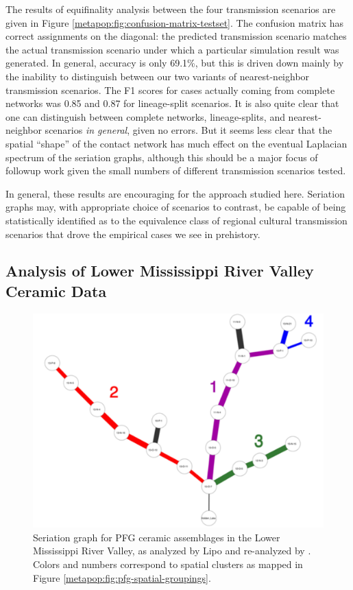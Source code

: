     The results of equifinality analysis between the four transmission scenarios are given in Figure \ref{metapop:fig:confusion-matrix-testset}.  The confusion matrix has correct assignments on the diagonal:  the predicted transmission scenario matches the actual transmission scenario under which a particular simulation result was generated.  In general, accuracy is only 69.1\%, but this is driven down mainly by the inability to distinguish between our two variants of nearest-neighbor transmission scenarios.  The F1 scores for cases actually coming from complete networks was 0.85 and 0.87 for lineage-split scenarios.  It is also quite clear that one can distinguish between complete networks, lineage-splits, and nearest-neighbor scenarios \emph{in general}, given no errors. But it seems less clear that the spatial ``shape'' of the contact network has much effect on the eventual Laplacian spectrum of the seriation graphs, although this should be a major focus of followup work given the small numbers of different transmission scenarios tested.  
    
    In general, these results are encouraging for the approach studied here.  Seriation graphs may, with appropriate choice of scenarios to contrast, be capable of being statistically identified as to the equivalence class of regional cultural transmission scenarios that drove the empirical cases we see in prehistory. 
    
    \subsection{Analysis of Lower Mississippi River Valley Ceramic Data}\label{metapop:sec:results-lmv}
    
    \begin{figure}[ht]
    \centering
    \includegraphics[scale=0.5]{graphics/multipleseriation/pfg-seriation-graph-minmax.pdf}
    \caption{Seriation graph for PFG \citeyearpar{Phillips1951} ceramic assemblages in 
    the Lower Mississippi River Valley, as analyzed by Lipo \citeyearpar{Lipo2001a} and re-analyzed by \citet{lipomadsendunnell2015}. Colors and numbers correspond to spatial clusters as mapped in Figure \ref{metapop:fig:pfg-spatial-groupings}.}
    \label{metapop:fig:pfg-seriation-graphs}
    \end{figure}
    
